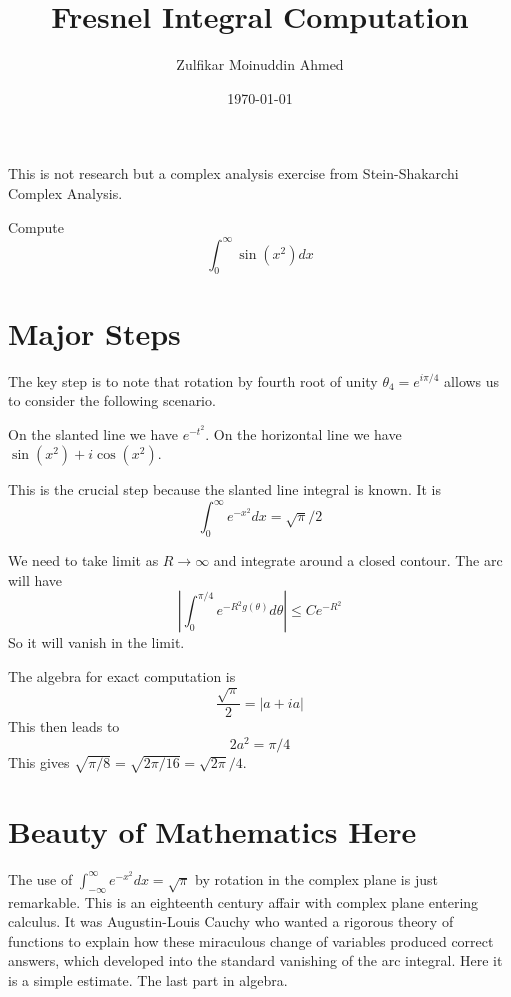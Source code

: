 \documentclass{amsart}
\title{Fresnel Integral Computation}
\author{Zulfikar Moinuddin Ahmed}
\date{\today}
\begin{document}
\maketitle

This is not research but a complex analysis exercise from Stein-Shakarchi Complex Analysis.

Compute
\[
\int_0^\infty \sin(x^2) dx
\]

\section{Major Steps}

The key step is to note that rotation by fourth root of unity $\theta_4 = e^{i\pi/4}$ allows us to consider the following scenario.

On the slanted line we have $e^{-t^2}$.  On the horizontal line we have $\sin(x^2)+i \cos(x^2)$.

This is the crucial step because the slanted line integral is known.  It is
\[
\int_0^{\infty} e^{-x^2} dx = \sqrt{\pi}/2
\]


We need to take limit as $R\rightarrow\infty$ and integrate around a closed contour.  The arc will have
\[
| \int_0^{\pi/4} e^{-R^2 g(\theta)} d\theta| \le C e^{-R^2}
\]
So it will vanish in the limit.

The algebra for exact computation is
\[
\frac{\sqrt{\pi}}{2} = | a + i a|
\]
This then leads to
\[
2a^2 = \pi/4
\]
This gives $\sqrt{\pi/8} = \sqrt{2\pi/16} = \sqrt{2 \pi}/4$.  

\section{Beauty of Mathematics Here}

The use of $\int_{-\infty}^\infty e^{-x^2} dx = \sqrt{\pi}$ by rotation in the complex plane is just remarkable.  This is an eighteenth century affair with complex plane entering calculus.  It was Augustin-Louis Cauchy who wanted a rigorous theory of functions to explain how these miraculous change of variables produced correct answers, which developed into the standard vanishing of the arc integral.  Here it is a simple estimate. The last part in algebra.
\end{document}
